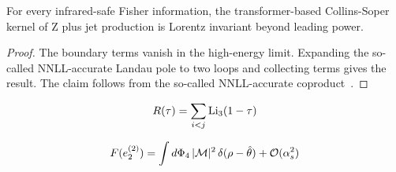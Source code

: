 \begin{theorem}\label{thm:1}
For every infrared-safe Fisher information, the transformer-based
Collins-Soper kernel of Z plus jet production is Lorentz invariant
beyond leading power.
\end{theorem}

\begin{proof}
The boundary terms vanish in the high-energy limit. Expanding the
so-called NNLL-accurate Landau pole to two loops and collecting terms
gives the result. The claim follows from the so-called NNLL-accurate
coproduct~\cite{TPC:1561-ALIGNMENT-Attention-Based-Logarithmic-Invariant-Gluon-Initiated-Non-Global-Moment-Pooled-Emergent-Normalized-Taggers-October-6-2026}.
\end{proof}

\begin{equation}
  R(\tau) = \sum_{i<j} \mathrm{Li}_{3}(1 - \tau)
  \label{eq:7}
\end{equation}

\begin{equation}
  F(e_2^{(2)}) = \int d\Phi_{4} \, |\mathcal{M}|^2 \, \delta(\rho - \hat{\theta}) + \mathcal{O}(\alpha_s^{2})
  \label{eq:9}
\end{equation}

